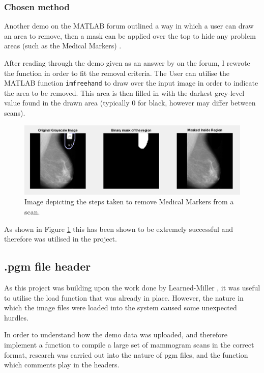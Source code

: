 \subsubsection{Chosen method}

Another demo on the MATLAB forum outlined a way in which a user can draw an area to remove, then a mask can be applied over the top to hide any problem areas (such as the Medical Markers) \cite{binary_mask}.

After reading through the demo given as an answer by  on the forum, I rewrote the function in order to fit the removal criteria. The User can utilise the MATLAB function \texttt{imfreehand} \cite{imfreehand} to draw over the input image in order to indicate the area to be removed. This area is then filled in with the darkest grey-level value found in the drawn area (typically 0 for black, however may differ between scans).

\begin{figure}[H]
  \centering
  \includegraphics[scale=0.4]{Chapter2/technical-img/draw-to-remove.png}
  \caption{Image depicting the steps taken to remove Medical Markers from a scan.}
  \label{fig:remove-marker}
\end{figure}

As shown in Figure \ref{fig:remove-marker} this has been shown to be extremely successful and therefore was utilised in the project.

\subsection{.pgm file header}

As this project was building upon the work done by Learned-Miller \cite{joint-alignment}, it was useful to utilise the load function that was already in place. However, the nature in which the image files were loaded into the system caused some unexpected hurdles.

In order to understand how the demo data was uploaded, and therefore implement a function to compile a large set of mammogram scans in the correct format, research was carried out into the nature of \acrshort{pgm} files, and the function which comments play in the headers.

